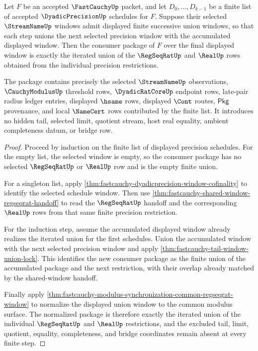 \begin{theorem}
\label{thm:fastcauchy-bishop-regular-induction}
Let $F$ be an accepted $\FastCauchyUp$ packet, and let
$D_{0},\ldots,D_{k-1}$ be a finite list of accepted $\DyadicPrecisionUp$
schedules for $F$. Suppose their selected $\StreamNameUp$ windows admit
displayed finite successive union windows, so that each step unions the next
selected precision window with the accumulated displayed window. Then the
consumer package of $F$ over the final displayed window is exactly the iterated
union of the $\RegSeqRatUp$ and $\RealUp$ rows obtained from the individual
precision restrictions.

The package contains precisely the selected $\StreamNameUp$ observations,
$\CauchyModulusUp$ threshold rows, $\DyadicRatCoreUp$ endpoint rows, late-pair
radius ledger entries, displayed $\hsame$ rows, displayed $\Cont$ routes,
$\mathsf{Pkg}$ provenance, and local $\NameCert$ rows contributed by the
finite list. It introduces no hidden tail, selected limit, quotient stream,
host real equality, ambient completeness datum, or bridge row.
\end{theorem}
\begin{proof}
Proceed by induction on the finite list of displayed precision schedules. For
the empty list, the selected window is empty, so the consumer package has no
selected $\RegSeqRatUp$ or $\RealUp$ row and is the empty finite union.

For a singleton list, apply
\autoref{thm:fastcauchy-dyadicprecision-window-cofinality} to identify the
selected schedule window. Then use
\autoref{thm:fastcauchy-shared-window-regseqrat-handoff} to read the
$\RegSeqRatUp$ handoff and the corresponding $\RealUp$ rows from that same
finite precision restriction.

For the induction step, assume the accumulated displayed window already
realizes the iterated union for the first schedules. Union the accumulated
window with the next selected precision window and apply
\autoref{thm:fastcauchy-tail-window-union-lock}. This identifies the new
consumer package as the finite union of the accumulated package and the next
restriction, with their overlap already matched by the shared-window handoff.

Finally apply
\autoref{thm:fastcauchy-modulus-synchronization-common-regseqrat-window} to
normalize the displayed union window to the common modulus surface. The
normalized package is therefore exactly the iterated union of the individual
$\RegSeqRatUp$ and $\RealUp$ restrictions, and the excluded tail, limit,
quotient, equality, completeness, and bridge coordinates remain absent at every
finite step.
\end{proof}

